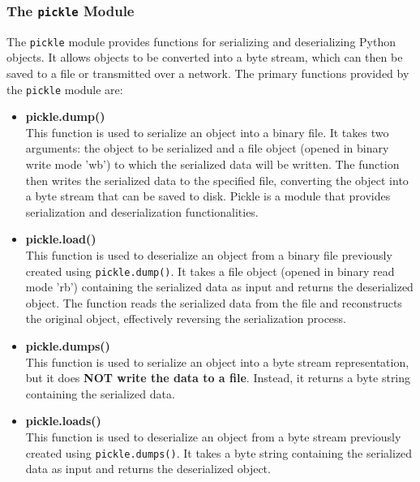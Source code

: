 \newpage
\subsubsection{The \texttt{pickle} Module}
The \texttt{pickle} module provides functions for serializing and deserializing Python objects. It allows objects to be converted into a byte stream, which can then be saved to a file or transmitted over a network. The primary functions provided by the \texttt{pickle} module are:

\begin{itemize}
    \item \textbf{pickle.dump()}\\
    This function is used to serialize an object into a binary file. It takes two arguments: the object to be serialized and a file object (opened in binary write mode 'wb') to which the serialized data will be written. The function then writes the serialized data to the specified file, converting the object into a byte stream that can be saved to disk. Pickle is a module that provides serialization and deserialization functionalities.
    
    \item \textbf{pickle.load()}\\
    This function is used to deserialize an object from a binary file previously created using \texttt{pickle.dump()}. It takes a file object (opened in binary read mode 'rb') containing the serialized data as input and returns the deserialized object. The function reads the serialized data from the file and reconstructs the original object, effectively reversing the serialization process.
    
    \item \textbf{pickle.dumps()}\\
    This function is used to serialize an object into a byte stream representation, but it does \textbf{NOT write the data to a file}. Instead, it returns a byte string containing the serialized data.
    
    \item \textbf{pickle.loads()}\\
    This function is used to deserialize an object from a byte stream previously created using \texttt{pickle.dumps()}. It takes a byte string containing the serialized data as input and returns the deserialized object.
\end{itemize}



